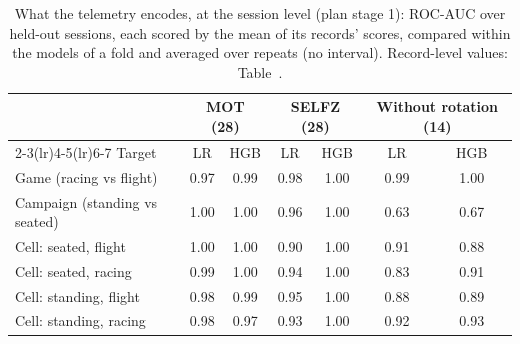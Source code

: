 \begin{table}[ht]
\centering
\footnotesize
\caption{What the telemetry encodes, at the session level (plan stage 1): ROC-AUC over held-out sessions, each scored by the mean of its records' scores, compared within the models of a fold and averaged over repeats (no interval). Record-level values: Table~.}
\label{tab:supp_decode_session}
\setlength{\tabcolsep}{3pt}
\begin{tabular}{@{}lcccccc@{}}
\toprule
 & \multicolumn{2}{c}{MOT (28)} & \multicolumn{2}{c}{SELFZ (28)} & \multicolumn{2}{c}{Without rotation (14)} \\
\cmidrule(lr){2-3}\cmidrule(lr){4-5}\cmidrule(lr){6-7}
Target & LR & HGB & LR & HGB & LR & HGB \\
\midrule
Game (racing vs flight) & 0.97 & 0.99 & 0.98 & 1.00 & 0.99 & 1.00 \\
Campaign (standing vs seated) & 1.00 & 1.00 & 0.96 & 1.00 & 0.63 & 0.67 \\
Cell: seated, flight & 1.00 & 1.00 & 0.90 & 1.00 & 0.91 & 0.88 \\
Cell: seated, racing & 0.99 & 1.00 & 0.94 & 1.00 & 0.83 & 0.91 \\
Cell: standing, flight & 0.98 & 0.99 & 0.95 & 1.00 & 0.88 & 0.89 \\
Cell: standing, racing & 0.98 & 0.97 & 0.93 & 1.00 & 0.92 & 0.93 \\
\bottomrule
\end{tabular}
\end{table}